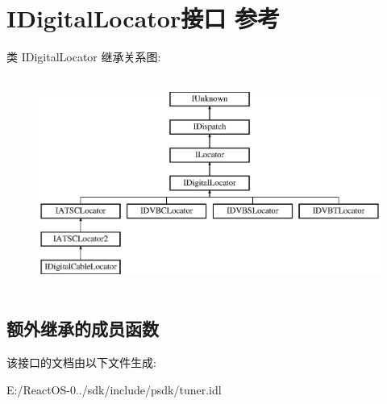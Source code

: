 \hypertarget{interface_i_digital_locator}{}\section{I\+Digital\+Locator接口 参考}
\label{interface_i_digital_locator}
类 I\+Digital\+Locator 继承关系图\+:\begin{figure}[H]
\begin{center}
\leavevmode
\includegraphics[height=7.000000cm]{interface_i_digital_locator}
\end{center}
\end{figure}
\subsection*{额外继承的成员函数}


该接口的文档由以下文件生成\+:\begin{DoxyCompactItemize}
\item 
E\+:/\+React\+O\+S-\/0../sdk/include/psdk/tuner.\+idl\end{DoxyCompactItemize}
